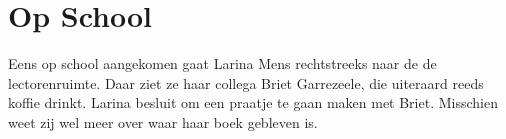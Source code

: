 \section{Op School}

Eens op school aangekomen gaat Larina Mens rechtstreeks naar de de
lectorenruimte. Daar ziet ze haar collega Briet Garrezeele, die uiteraard reeds
koffie drinkt. Larina besluit om een praatje te gaan maken met Briet. Misschien
weet zij wel meer over waar haar boek gebleven is.
